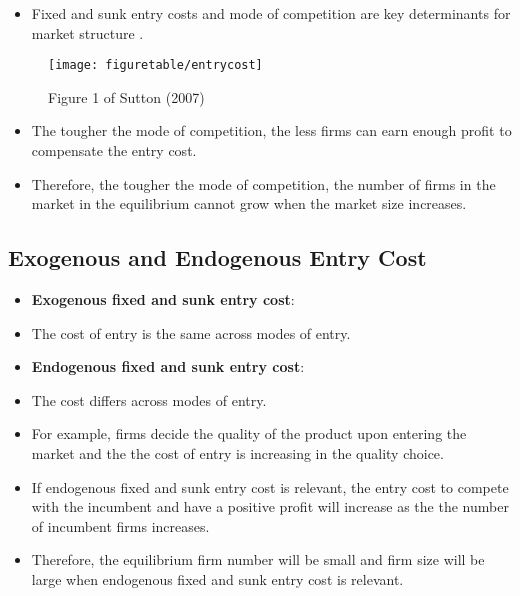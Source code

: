 \documentclass[
]{book}
\providecommand{\tightlist}{%
  \setlength{\itemsep}{0pt}\setlength{\parskip}{0pt}}
\begin{document}
\begin{itemize}
\tightlist
\item
  Fixed and sunk entry costs and mode of competition are key determinants for market structure \citep{suttonChapter35Market2007}.
\end{itemize}

\begin{figure}

{\centering \texttt{[image: figuretable/entrycost]} 

}

\caption{Figure 1 of Sutton (2007)}\label{fig:unnamed-chunk-5}
\end{figure}

\begin{itemize}
\tightlist
\item
  The tougher the mode of competition, the less firms can earn enough profit to compensate the entry cost.
\item
  Therefore, the tougher the mode of competition, the number of firms in the market in the equilibrium cannot grow when the market size increases.
\end{itemize}

\hypertarget{exogenous-and-endogenous-entry-cost}{%
\subsection{Exogenous and Endogenous Entry Cost}\label{exogenous-and-endogenous-entry-cost}}

\begin{itemize}
\tightlist
\item
  \textbf{Exogenous fixed and sunk entry cost}:
\item
  The cost of entry is the same across modes of entry.
\item
  \textbf{Endogenous fixed and sunk entry cost}:
\item
  The cost differs across modes of entry.
\item
  For example, firms decide the quality of the product upon entering the market and the the cost of entry is increasing in the quality choice.
\item
  If endogenous fixed and sunk entry cost is relevant, the entry cost to compete with the incumbent and have a positive profit will increase as the the number of incumbent firms increases.
\item
  Therefore, the equilibrium firm number will be small and firm size will be large when endogenous fixed and sunk entry cost is relevant.
\end{itemize}
\end{document}
